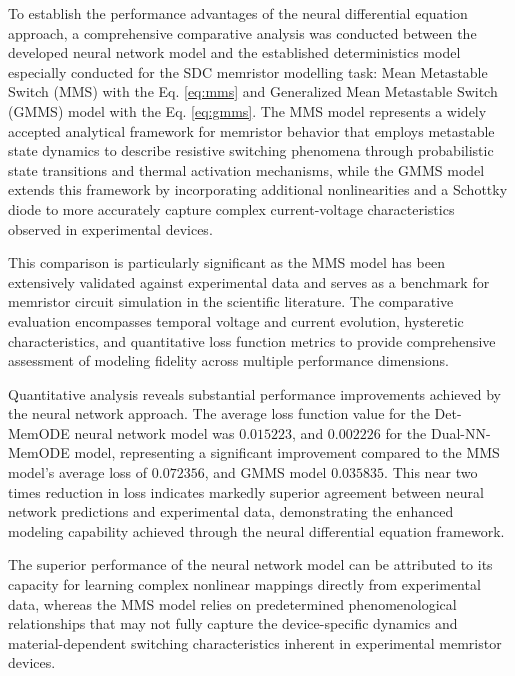 \documentclass[11pt, oneside]{article}
\begin{document}
To establish the performance advantages of the neural differential equation approach, a comprehensive comparative analysis was conducted between the developed neural network model and the established deterministics model especially conducted for the SDC memristor modelling task: Mean Metastable Switch (MMS) with the Eq. \eqref{eq:mms} and Generalized Mean Metastable Switch (GMMS) model with the Eq. \eqref{eq:gmms}. The MMS model represents a widely accepted analytical framework for memristor behavior that employs metastable state dynamics to describe resistive switching phenomena through probabilistic state transitions and thermal activation mechanisms, while the GMMS model extends this framework by incorporating additional nonlinearities and a Schottky diode to more accurately capture complex current-voltage characteristics observed in experimental devices.

This comparison is particularly significant as the MMS model has been extensively validated against experimental data and serves as a benchmark for memristor circuit simulation in the scientific literature. The comparative evaluation encompasses temporal voltage and current evolution, hysteretic characteristics, and quantitative loss function metrics to provide comprehensive assessment of modeling fidelity across multiple performance dimensions.

Quantitative analysis reveals substantial performance improvements achieved by the neural network approach. The average loss function value for the Det-MemODE neural network model was $0.015223$, and $0.002226$ for the Dual-NN-MemODE model, representing a significant improvement compared to the MMS model's average loss of $0.072356$, and GMMS model $0.035835$. This near two times reduction in loss indicates markedly superior agreement between neural network predictions and experimental data, demonstrating the enhanced modeling capability achieved through the neural differential equation framework.


The superior performance of the neural network model can be attributed to its capacity for learning complex nonlinear mappings directly from experimental data, whereas the MMS model relies on predetermined phenomenological relationships that may not fully capture the device-specific dynamics and material-dependent switching characteristics inherent in experimental memristor devices.
\newcommand{\redbar}{\protect\tikz[baseline=-0.1ex]\fill[ieeered] (0,0) rectangle (0.8em,1.2ex);}\newcommand{\bluebar}{\protect\tikz[baseline=-0.1ex]\fill[ieeeblue] (0,0) rectangle (0.8em,1.2ex);}
\newcommand{\greenbar}{\protect\tikz[baseline=-0.1ex]\fill[ieeegreen] (0,0) rectangle (0.8em,1.2ex);}
\end{document}
